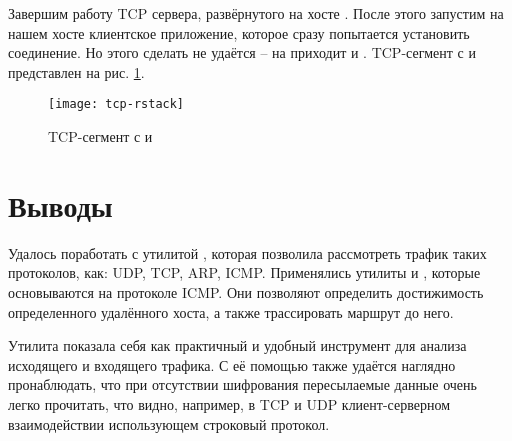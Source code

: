 Завершим работу TCP сервера, развёрнутого на хосте . После этого запустим на нашем хосте клиентское приложение, которое сразу попытается установить соединение. Но этого сделать не удаётся -- на  приходит  и . TCP-сегмент с  и  представлен на рис. \ref{fig:tcp-rstack}.

\begin{figure}[H]
	\centering
	\texttt{[image: tcp-rstack]}
	\caption{TCP-сегмент с  и }
	\label{fig:tcp-rstack}
\end{figure}

\section{Выводы}

Удалось поработать с утилитой , которая позволила рассмотреть трафик таких протоколов, как: UDP, TCP, ARP, ICMP. Применялись утилиты  и , которые основываются на протоколе ICMP. Они позволяют определить достижимость определенного удалённого хоста, а также трассировать маршрут до него.

Утилита  показала себя как практичный и удобный инструмент для анализа исходящего и входящего трафика. С её помощью также удаётся наглядно пронаблюдать, что при отсутствии шифрования пересылаемые данные очень легко прочитать, что видно, например, в TCP и UDP клиент-серверном взаимодействии использующем строковый протокол.


